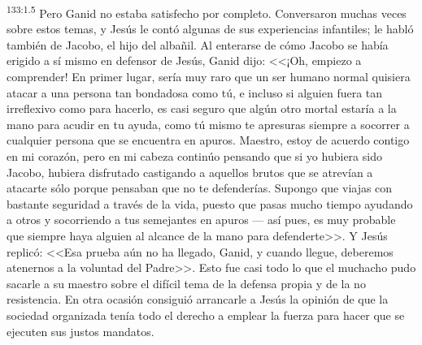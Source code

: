 \par 
\textsuperscript{133:1.5} Pero Ganid no estaba satisfecho por completo. Conversaron muchas veces sobre estos temas, y Jesús le contó algunas de sus experiencias infantiles; le habló también de Jacobo, el hijo del albañil. Al enterarse de cómo Jacobo se había erigido a sí mismo en defensor de Jesús, Ganid dijo: <<¡Oh, empiezo a comprender! En primer lugar, sería muy raro que un ser humano normal quisiera atacar a una persona tan bondadosa como tú, e incluso si alguien fuera tan irreflexivo como para hacerlo, es casi seguro que algún otro mortal estaría a la mano para acudir en tu ayuda, como tú mismo te apresuras siempre a socorrer a cualquier persona que se encuentra en apuros. Maestro, estoy de acuerdo contigo en mi corazón, pero en mi cabeza continúo pensando que si yo hubiera sido Jacobo, hubiera disfrutado castigando a aquellos brutos que se atrevían a atacarte sólo porque pensaban que no te defenderías. Supongo que viajas con bastante seguridad a través de la vida, puesto que pasas mucho tiempo ayudando a otros y socorriendo a tus semejantes en apuros --- así pues, es muy probable que siempre haya alguien al alcance de la mano para defenderte>>. Y Jesús replicó: <<Esa prueba aún no ha llegado, Ganid, y cuando llegue, deberemos atenernos a la voluntad del Padre>>. Esto fue casi todo lo que el muchacho pudo sacarle a su maestro sobre el difícil tema de la defensa propia y de la no resistencia. En otra ocasión consiguió arrancarle a Jesús la opinión de que la sociedad organizada tenía todo el derecho a emplear la fuerza para hacer que se ejecuten sus justos mandatos.

